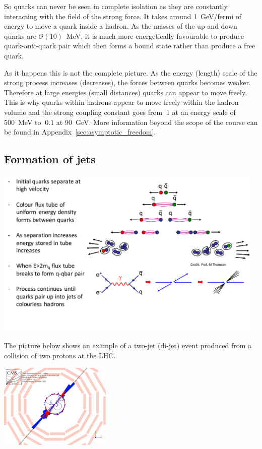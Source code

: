 So quarks can never be seen in complete isolation as they are constantly interacting with the field of the strong force. It takes around 1~GeV/fermi of energy to move a quark inside a hadron. As the masses of the up and down quarks are $\mathcal{O}(10)$~MeV, it is much more energetically favourable to produce quark-anti-quark pair which then forms a bound state rather than produce a free quark.

As it happens this is not the complete picture. As the energy (length)
scale of the strong process increases (decreases), the forces between
quarks becomes weaker. Therefore at large energies (small distances)
quarks can appear to move freely. This is why quarks within
hadrons appear to move freely within the hadron volume and the strong
coupling constant goes from $~1$ at an energy scale of 500~MeV to
$~0.1$ at 90~GeV. More information beyond the scope of the course can
be found in Appendix~\ref{sec:asymptotic_freedom}.

\subsection{Formation of jets}
\label{sec:FormationOfJets}
\begin{center}
\includegraphics[width=0.97\textwidth]{fig/strongforce/jet_formation_2.pdf}
\end{center}

The picture below shows an example of a two-jet (di-jet) event produced from a collision of two protons at the LHC. 
\begin{center}
\includegraphics[width=0.4\textwidth]{fig/strongforce/cms_dijet.png}
\end{center}


